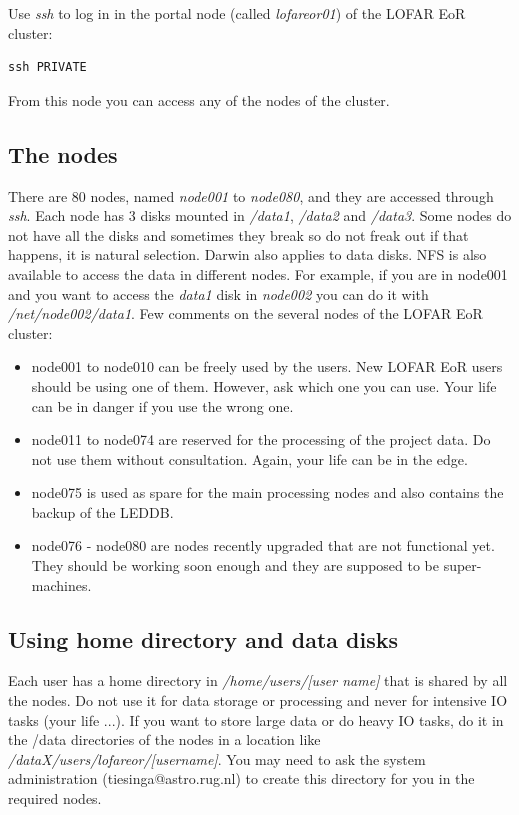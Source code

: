 \documentclass[a4paper,11pt]{article}
\begin{document}
Use \textit{ssh} to log in in the portal node (called \textit{lofareor01}) of the LOFAR EoR cluster:

\begin{verbatim}
ssh PRIVATE
\end{verbatim}

From this node you can access any of the nodes of the cluster. 

\subsection*{The nodes}

There are 80 nodes, named \textit{node001} to \textit{node080}, and they are accessed through \textit{ssh}. Each node has 3 disks mounted in \textit{/data1}, \textit{/data2} and \textit{/data3}. Some nodes do not have all the disks and sometimes they break so do not freak out if that happens, it is natural selection. Darwin also applies to data disks.
NFS is also available to access the data in different nodes. For example, if you are in node001 and you want to access the \textit{data1} disk in \textit{node002} you can do it with \textit{/net/node002/data1}. Few comments on the several nodes of the LOFAR EoR cluster:

\begin{itemize}
	\item node001 to node010 can be freely used by the users. New LOFAR EoR users should be using one of them.  However, ask which one you can use. Your life can be in danger if you use the wrong one.
	\item node011 to node074 are reserved for the processing of the project data. Do not use them without consultation. Again, your life can be in the edge.
	\item node075 is used as spare for the main processing nodes and also contains the backup of the LEDDB.
	\item node076 - node080 are nodes recently upgraded that are not functional yet. They should be working soon enough and they are supposed to be super-machines.
\end{itemize}

\subsection*{Using home directory and data disks}

Each user has a home directory in \textit{/home/users/[user name]} that is shared by all the nodes. Do not use it for data storage or processing and never for intensive IO tasks (your life ...). If you want to store large data or do heavy IO tasks, do it in the /data directories of the nodes in a location like \textit{/dataX/users/lofareor/[username]}. You may need to ask the system administration (tiesinga@astro.rug.nl) to create this directory for you in the required nodes.
\end{document}
